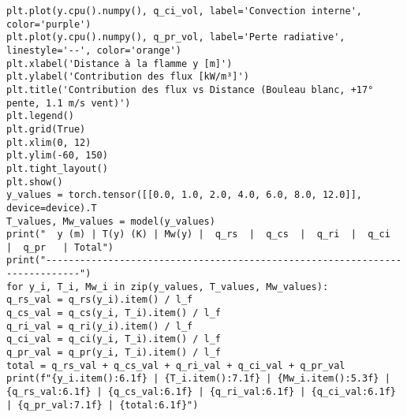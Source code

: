 \documentclass[12pt, oneside]{report} %
\theoremstyle{definition}
\theoremstyle{remark}
\begin{document}
\begin{lstlisting}[style=pythonstyle]
plt.plot(y.cpu().numpy(), q_ci_vol, label='Convection interne', color='purple')
plt.plot(y.cpu().numpy(), q_pr_vol, label='Perte radiative', linestyle='--', color='orange')
plt.xlabel('Distance à la flamme y [m]')
plt.ylabel('Contribution des flux [kW/m³]')
plt.title('Contribution des flux vs Distance (Bouleau blanc, +17° pente, 1.1 m/s vent)')
plt.legend()
plt.grid(True)
plt.xlim(0, 12)
plt.ylim(-60, 150)
plt.tight_layout()
plt.show()
y_values = torch.tensor([[0.0, 1.0, 2.0, 4.0, 6.0, 8.0, 12.0]], device=device).T
T_values, Mw_values = model(y_values)
print("  y (m) | T(y) (K) | Mw(y) |  q_rs  |  q_cs  |  q_ri  |  q_ci  |  q_pr   | Total")
print("----------------------------------------------------------------------------")
for y_i, T_i, Mw_i in zip(y_values, T_values, Mw_values):
q_rs_val = q_rs(y_i).item() / l_f 
q_cs_val = q_cs(y_i, T_i).item() / l_f 
q_ri_val = q_ri(y_i).item() / l_f 
q_ci_val = q_ci(y_i, T_i).item() / l_f 
q_pr_val = q_pr(y_i, T_i).item() / l_f 
total = q_rs_val + q_cs_val + q_ri_val + q_ci_val + q_pr_val
print(f"{y_i.item():6.1f} | {T_i.item():7.1f} | {Mw_i.item():5.3f} | {q_rs_val:6.1f} | {q_cs_val:6.1f} | {q_ri_val:6.1f} | {q_ci_val:6.1f} | {q_pr_val:7.1f} | {total:6.1f}")
\end{lstlisting}
\end{document}
